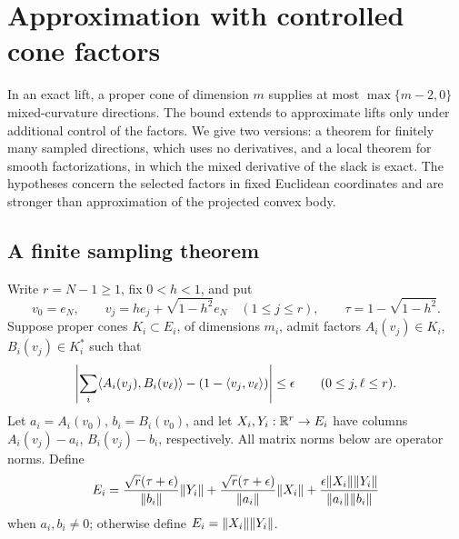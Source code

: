 \section{Approximation with controlled cone factors}\label{sec:conditioned-approximation}
In an exact lift, a proper cone of dimension $m$ supplies at most
$\max\{m-2,0\}$ mixed-curvature directions. The bound extends to
approximate lifts only under additional control of the factors. We give
two versions: a theorem for finitely many sampled directions, which
uses no derivatives, and a local theorem for smooth factorizations, in
which the mixed derivative of the slack is exact. The hypotheses concern
the selected factors in fixed Euclidean coordinates and are stronger
than approximation of the projected convex body.

\subsection{A finite sampling theorem}
Write $r=N-1\geq1$, fix $0<h<1$, and put
\[
 v_0=e_N,\qquad v_j=he_j+\sqrt{1-h^2}e_N\quad(1\leq j\leq r),
 \qquad \tau=1-\sqrt{1-h^2}.
\]
Suppose proper cones $K_i\subset E_i$, of dimensions $m_i$, admit
factors $A_i(v_j)\in K_i$, $B_i(v_j)\in K_i^*$ such that
\begin{equation}\label{eq:finite-slack-error}
 \left|\sum_i\langle A_i(v_j),B_i(v_\ell)\rangle
       -(1-\langle v_j,v_\ell\rangle)\right|\leq\epsilon
 \qquad(0\leq j,\ell\leq r).
\end{equation}
Let $a_i=A_i(v_0)$, $b_i=B_i(v_0)$, and let $X_i,Y_i:\mathbb R^r\to E_i$
have columns $A_i(v_j)-a_i$, $B_i(v_j)-b_i$, respectively.
All matrix norms below are operator norms. Define
\begin{equation}\label{eq:finite-factor-error}
 E_i=\frac{\sqrt r(\tau+\epsilon)}{\lVert b_i\rVert}\lVert Y_i\rVert
    +\frac{\sqrt r(\tau+\epsilon)}{\lVert a_i\rVert}\lVert X_i\rVert
    +\frac{\epsilon\lVert X_i\rVert\lVert Y_i\rVert}{\lVert a_i\rVert\lVert b_i\rVert}
\end{equation}
when $a_i,b_i\ne0$; otherwise define $E_i=\lVert X_i\rVert\lVert Y_i\rVert$.

